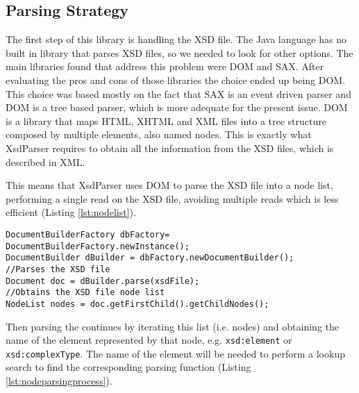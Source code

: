 \subsection{Parsing Strategy}
\label{sec:parsingstrategy}

The first step of this library is handling the \ac{XSD} file. The Java language has no built in library that parses \ac{XSD} files, so we needed to look for other options. The main libraries found that address this problem were \ac{DOM} and \ac{SAX}. After evaluating the pros and cons of those libraries the choice ended up being \ac{DOM}. This choice was based mostly on the fact that \ac{SAX} is an event driven parser and \ac{DOM} is a tree based parser, which is more adequate for the present issue. \ac{DOM} is a library that maps \ac{HTML}, \ac{XHTML} and \ac{XML} files into a tree structure composed by multiple elements, also named nodes. This is exactly what XsdParser requires to obtain all the information from the \ac{XSD} files, which is described in \ac{XML}. 

\noindent
This means that XsdParser uses \ac{DOM} to parse the \ac{XSD} file into a node list, performing a single read on the \ac{XSD} file, avoiding multiple reads which is less efficient (Listing \ref{lst:nodelist}). 

\bigskip


\begin{minipage}{\linewidth}
\begin{lstlisting}[caption={DOM Document Parsing}, label={lst:nodelist}]
DocumentBuilderFactory dbFactory= DocumentBuilderFactory.newInstance();
DocumentBuilder dBuilder = dbFactory.newDocumentBuilder();
//Parses the XSD file
Document doc = dBuilder.parse(xsdFile);
//Obtains the XSD file node list
NodeList nodes = doc.getFirstChild().getChildNodes();
\end{lstlisting}
\end{minipage}

\newpage

\noindent
Then parsing the continues by iterating this list (i.e. nodes) and obtaining the name of the element represented by that node, e.g. \texttt{xsd:element} or \texttt{xsd:complexType}. The name of the element will be needed to perform a lookup search to find the corresponding parsing function (Listing \ref{lst:nodeparsingprocess}). 

